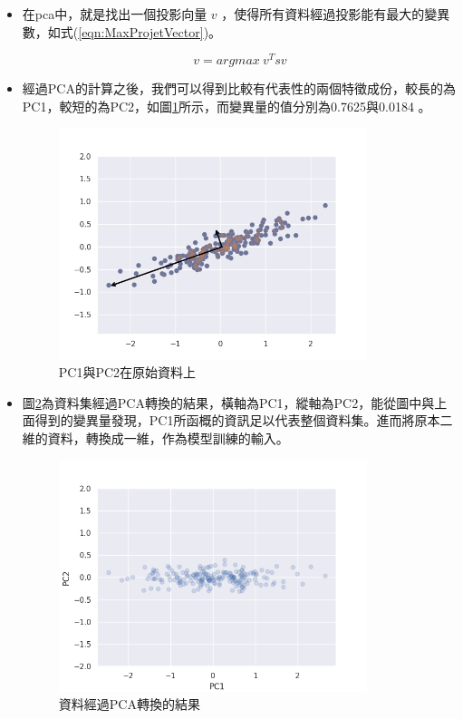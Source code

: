 \begin{itemize}
	\item
		在pca中，就是找出一個投影向量 \(v\) ，使得所有資料經過投影能有最大的變異數，如式(\ref{eqn:MaxProjetVector})。

		\begin{equation}
			\label{eqn:MaxProjetVector}
			v = arg max\  v^Tsv			
		\end{equation}



		\newpage
	\item
		經過PCA的計算之後，我們可以得到比較有代表性的兩個特徵成份，較長的為PC1，較短的為PC2，如圖\ref{fig:Pc1AndPc2}所示，而變異量的值分別為0.7625與0.0184 。


	      \begin{figure}[H]
		      \centering
		      \includegraphics[width=9cm]{pic/pca_with_pca_axis.png}
		      \caption{PC1與PC2在原始資料上}
		      \label{fig:Pc1AndPc2}
	      \end{figure}


	\item
	圖\ref{fig:PcaTransform}為資料集經過PCA轉換的結果，橫軸為PC1，縱軸為PC2，能從圖中與上面得到的變異量發現，PC1所函概的資訊足以代表整個資料集。進而將原本二維的資料，轉換成一維，作為模型訓練的輸⼊。


	      \begin{figure}[H]
		      \centering
		      \includegraphics[width=9cm]{pic/pca_transform.png}
		      \caption{資料經過PCA轉換的結果}
		      \label{fig:PcaTransform}
	      \end{figure}

\end{itemize}


